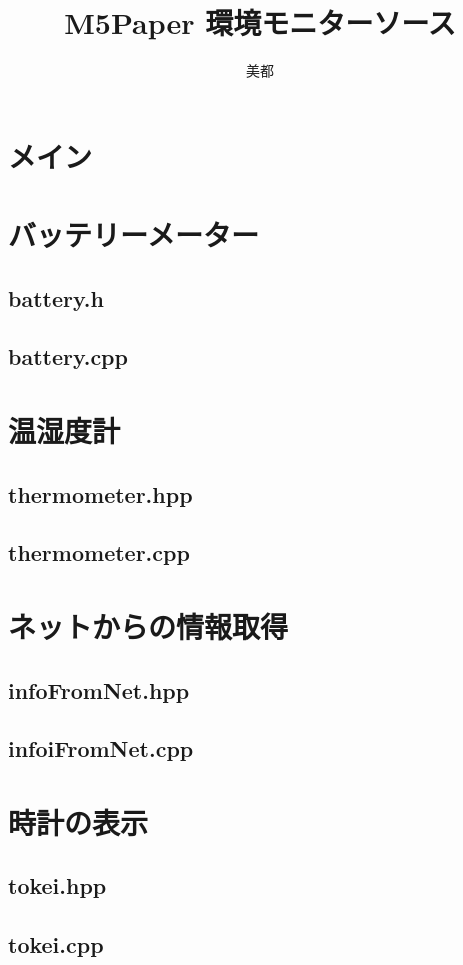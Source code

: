 \documentclass[a4paper, 10pt]{ltjsarticle}
\title{M5Paper 環境モニターソース}
\author{美都}
\begin{document}
\maketitle
\tableofcontents
\clearpage

\section {メイン}

\clearpage
\section {バッテリーメーター}
\subsection {battery.h}

\subsection {battery.cpp}

\clearpage

\section{温湿度計}
\subsection{thermometer.hpp}

\subsection{thermometer.cpp}

\clearpage

\section{ネットからの情報取得}
\subsection{infoFromNet.hpp}

\subsection{infoiFromNet.cpp}

\clearpage

\section{時計の表示}
\subsection{tokei.hpp}

\subsection{tokei.cpp}

\end{document}

